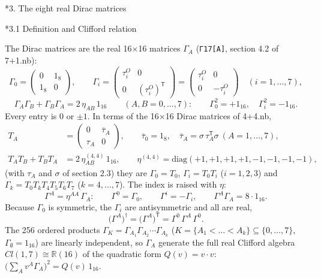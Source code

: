 \documentclass[10pt,a4paper]{article}
\makeatletter
\renewcommand\section{\@startsection{section}{1}{\z@}{-3.5ex \@plus -1ex \@minus -.2ex}{2.3ex \@plus.2ex}{\normalfont\Large\bfseries\raggedright}}
\renewcommand\subsection{\@startsection{subsection}{2}{\z@}{-3.25ex\@plus -1ex \@minus -.2ex}{1.5ex \@plus .2ex}{\normalfont\large\bfseries\raggedright}}
\makeatother
\begin{document}
\section*{3. The eight real Dirac matrices}
\subsection*{3.1 Definition and Clifford relation}
The Dirac matrices are the real 16×16 matrices $\Gamma_A$ (\texttt{Γ17[A]}, section 4.2 of 7+1.nb):
\begin{equation*}
\Gamma_0=\begin{pmatrix}0&1_8\\1_8&0\end{pmatrix},\qquad \Gamma_i=\begin{pmatrix}\tau^{O}_i&0\\0&(\tau^{O}_i)^{\mathsf T}\end{pmatrix}=\begin{pmatrix}\tau^{O}_i&0\\0&-\tau^{O}_i\end{pmatrix}\quad(i=1,\dots,7),
\end{equation*}
\begin{equation*}
\Gamma_A\Gamma_B+\Gamma_B\Gamma_A=2\,\eta_{AB}\,1_{16}\qquad(A,B=0,\dots,7):\qquad \Gamma_0^2=+1_{16},\quad \Gamma_i^2=-1_{16}.
\end{equation*}
Every entry is $0$ or $\pm1$. In terms of the 16×16 Dirac matrices of 4+4.nb,
\begin{align*}
T_A&=\begin{pmatrix}0&\bar\tau_A\\ \tau_A&0\end{pmatrix},\qquad \bar\tau_0=1_8,\quad \bar\tau_A=\sigma\,\tau_A^{\mathsf T}\sigma\ (A=1,\dots,7), \\
T_AT_B+T_BT_A&=2\,\eta^{(4,4)}_{AB}\,1_{16},\qquad \eta^{(4,4)}=\mathrm{diag}(+1,+1,+1,+1,-1,-1,-1,-1),
\end{align*}
(with $\tau_A$ and $\sigma$ of section 2.3) they are $\Gamma_0=T_0$, $\Gamma_i=T_0T_i$ ($i=1,2,3$) and $\Gamma_k=T_0T_kT_4T_5T_6T_7$ ($k=4,\dots,7$). The index is raised with $\eta$:
\begin{equation*}
\Gamma^A=\eta^{AA}\,\Gamma_A:\qquad \Gamma^0=\Gamma_0,\qquad \Gamma^i=-\Gamma_i,\qquad \Gamma^A\Gamma_A=8\cdot1_{16}.
\end{equation*}
Because $\Gamma_0$ is symmetric, the $\Gamma_i$ are antisymmetric and all are real,
\begin{equation*}
\big(\Gamma^A\big)^\dagger=\big(\Gamma^A\big)^{\mathsf T}=\Gamma^0\,\Gamma^A\,\Gamma^0 .
\end{equation*}
The 256 ordered products $\Gamma_K=\Gamma_{A_1}\Gamma_{A_2}\cdots\Gamma_{A_k}$ ($K=\lbrace A_1<\dots<A_k\rbrace\subseteq\lbrace0,\dots,7\rbrace$, $\Gamma_\emptyset=1_{16}$) are linearly independent, so $\Gamma_A$ generate the full real Clifford algebra $Cl(1,7)\cong\mathbb R(16)$ of the quadratic form $Q(v)=v\cdot v$: $\big(\sum_Av^A\Gamma_A\big)^2=Q(v)\,1_{16}$.
\end{document}
